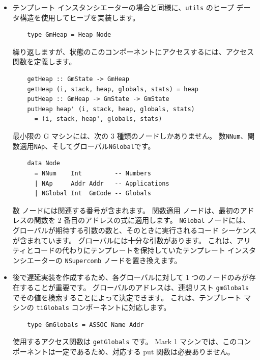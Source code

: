 \documentclass{jbook}
\begin{document}
\begin{itemize}
	\item テンプレート インスタンシエーターの場合と同様に、\texttt{utils} のヒープ データ構造を使用してヒープを実装します。

	      \begin{verbatim}
    type GmHeap = Heap Node
  \end{verbatim}

	      繰り返しますが、状態のこのコンポーネントにアクセスするには、アクセス関数を定義します。

	      \begin{verbatim}
    getHeap :: GmState -> GmHeap
    getHeap (i, stack, heap, globals, stats) = heap
    putHeap :: GmHeap -> GmState -> GmState
    putHeap heap' (i, stack, heap, globals, stats)
      = (i, stack, heap', globals, stats)
  \end{verbatim}

	      最小限の G マシンには、次の 3 種類のノードしかありません。
	      数\texttt{NNum}、関数適用\texttt{NAp}、そしてグローバル\texttt{NGlobal}です。

	      \begin{verbatim}
    data Node
      = NNum    Int         -- Numbers
      | NAp     Addr Addr   -- Applications
      | NGlobal Int  GmCode -- Globals
  \end{verbatim}

	      数 ノードには関連する番号が含まれます。
	      関数適用 ノードは、最初のアドレスの関数を 2 番目のアドレスの式に適用します。
	      \texttt{NGlobal} ノードには、グローバルが期待する引数の数と、そのときに実行されるコード シーケンスが含まれています。
	      グローバルには十分な引数があります。
	      これは、アリティとコードの代わりにテンプレートを保持していたテンプレート インスタンシエーターの \texttt{NSupercomb} ノードを置き換えます。

	\item 後で遅延実装を作成するため、各グローバルに対して 1 つのノードのみが存在することが重要です。
	      グローバルのアドレスは、連想リスト \texttt{gmGlobals} でその値を検索することによって決定できます。
	      これは、テンプレート マシンの \texttt{tiGlobals} コンポーネントに対応します。

	      \begin{verbatim}
    type GmGlobals = ASSOC Name Addr
  \end{verbatim}

	      使用するアクセス関数は \texttt{getGlobals} です。
	      Mark 1 マシンでは、このコンポーネントは一定であるため、対応する put 関数は必要ありません。


\end{itemize}
\end{document}
